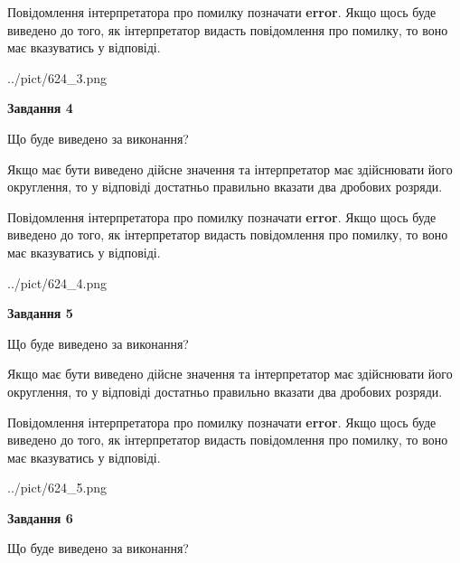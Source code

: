 \documentclass[12pt, ukrainian]{article}
\begin{document}
{\begin {Large}
Повідомлення інтерпретатора про помилку позначати \textbf{error}.
Якщо щось буде виведено до того, як інтерпретатор видасть повідомлення про помилку, 
то воно має вказуватись у відповіді. \par

\begin{center}
	{../pict/624_3.png}
\end{center}
\newpage

{\begin {center}\textbf{Завдання 4}\end {center}}\par
Що буде виведено за виконання? \par

Якщо має бути виведено дійсне значення та інтерпретатор має здійснювати його округлення, 
то у відповіді достатньо правильно вказати два дробових розряди.

Повідомлення інтерпретатора про помилку позначати \textbf{error}.
Якщо щось буде виведено до того, як інтерпретатор видасть повідомлення про помилку, 
то воно має вказуватись у відповіді. \par

\begin{center}
	{../pict/624_4.png}
\end{center}
\newpage

{\begin {center}\textbf{Завдання 5}\end {center}}\par
Що буде виведено за виконання? \par

Якщо має бути виведено дійсне значення та інтерпретатор має здійснювати його округлення, 
то у відповіді достатньо правильно вказати два дробових розряди.

Повідомлення інтерпретатора про помилку позначати \textbf{error}.
Якщо щось буде виведено до того, як інтерпретатор видасть повідомлення про помилку, 
то воно має вказуватись у відповіді. \par

\begin{center}
	{../pict/624_5.png}
\end{center}
\newpage

{\begin {center}\textbf{Завдання 6}\end {center}}\par
Що буде виведено за виконання? \par


\end{Large}}
\end{document}
